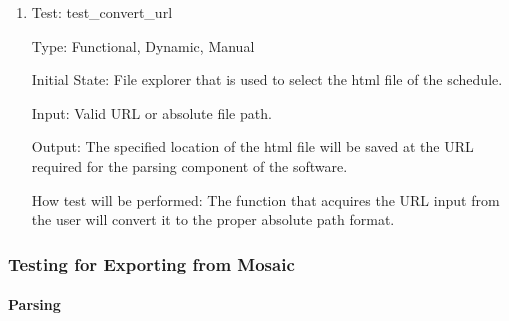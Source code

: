 \documentclass[12pt, titlepage]{article}
\begin{document}
\begin{enumerate}

\color{blue}\item{Test: test\_convert\_url\\}\color{black}

Type: Functional, Dynamic, Manual
					
Initial State:  File explorer that is used to select the html file of the schedule.
					
Input: Valid URL or absolute file path.

					
Output: The specified location of the html file will be saved at the URL required for the parsing component of the software.

\color{blue}How test will be performed: The function that acquires the URL input from the user will convert it to the proper absolute path format.\color{black}

				

\end{enumerate}

\subsubsection{Testing for Exporting from Mosaic}

\paragraph{Parsing}
\end{document}
